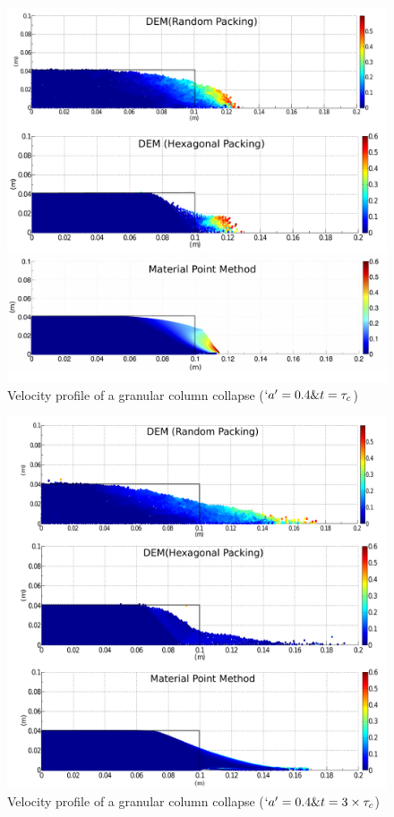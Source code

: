 \begin{figure}[tbhp]
\centering
\includegraphics[width=\textwidth]{a04tc}
\caption{Velocity profile of a granular column collapse ($`a' = 0.4 \& 
t=\tau_c$)}
\label{fig:a04tc}
\end{figure}



\begin{figure}[tbhp]
\centering
\includegraphics[width=\textwidth]{a04f}
\caption{Velocity profile of a granular column collapse ($`a' = 0.4 \& 
t=3\times\tau_c$)}
\label{fig:a04f}
\end{figure}


